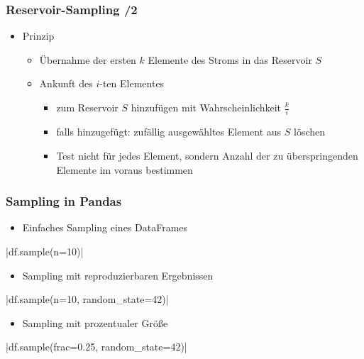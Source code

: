     
    \begin{frame}
    \frametitle{Reservoir-Sampling /2}
    
    \begin{itemize}
    \item Prinzip
    \begin{itemize}
    \item Übernahme der ersten $k$ Elemente des Stroms in das Reservoir
      $S$
    \item Ankunft des $i$-ten Elementes
    \begin{itemize}
    \item zum Reservoir $S$ hinzufügen mit Wahrscheinlichkeit
      $\frac{k}{i}$
    \item falls hinzugefügt: zufällig ausgewähltes Element aus $S$ löschen
    \item Test nicht für jedes Element, sondern Anzahl der zu
      überspringenden Elemente im voraus bestimmen
    \end{itemize}
    \end{itemize}
    \end{itemize}
    
    \end{frame}
    
    
    \begin{frame}
    \frametitle{Sampling in Pandas}
    
    \begin{itemize}
    \item Einfaches Sampling eines DataFrames
    \end{itemize}

    |df.sample(n=10)|
    
    \begin{itemize}
    \item Sampling mit reproduzierbaren Ergebnissen
    \end{itemize}

    |df.sample(n=10, random_state=42)|
    
    \begin{itemize}
    \item Sampling mit prozentualer Größe
    \end{itemize}
    
    |df.sample(frac=0.25, random_state=42)|
    
    \end{frame}
    
